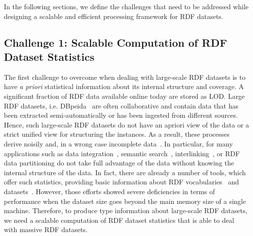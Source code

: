In the following sections, we define the challenges that need to be addressed while designing a scalable and efficient processing framework for \gls{RDF} datasets.

\subsection{Challenge 1: Scalable Computation of RDF Dataset Statistics}
\label{sec:c1}
The first challenge to overcome when dealing with large-scale \gls{RDF} datasets is to have \textit{a priori} statistical information about its internal structure and coverage.
A significant fraction of RDF data available online today are stored as \gls{LOD}.
Large \gls{RDF} datasets, i.e. DBpeida~\cite{dbpedia-swj} are often collaborative and contain data that has been extracted semi-automatically or has been ingested from different sources.
Hence, such large-scale \gls{RDF} datasets do not have an apriori view of the data or a strict unified view for structuring the instances.
As a result, these processes derive noisily and, in a wrong case incomplete data~\cite{zaveri2015quality}.
In particular, for many applications such as data integration~\cite{michel:tel-01508602}, semantic search~\cite{Tonon2012CII}, interlinking~\cite{Dutta2014PAI}, or \gls{RDF} data partitioning do not take full advantage of the data without knowing the internal structure of the data.
In fact, there are already a number of tools, which offer such statistics, providing basic information about \gls{RDF} vocabularies~\cite{vandenbussche2015linked} and datasets~\cite{conf/dexaw/LangeggerW09,ermilov-2013-kesw}.
However, those efforts showed severe deficiencies in terms of performance when the dataset size goes beyond the main memory size of a single machine.
Therefore, to produce type information about large-scale \gls{RDF} datasets, we need a scalable computation of \gls{RDF} dataset statistics that is able to deal with massive \gls{RDF} datasets.

